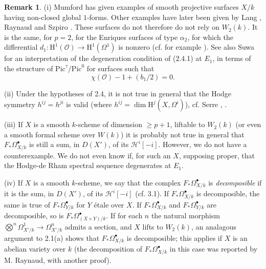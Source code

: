 \documentclass[10pt,reqno]{article}
\renewcommand{\H}{\mathrm{H}}
\newcommand{\HH}{\mathcal{H}}
\renewcommand{\O}{\mathcal{O}}
\newcommand{\al}{_\ast}
\newcommand{\bh}{^\bullet}
\theoremstyle{plain}
\theoremstyle{definition}
\newtheorem{rmk}[thm]{Remark}
\begin{document}
\begin{rmk}
(i) Mumford \cite{22} has given examples of smooth projective surfaces $X/k$ having non-closed
global $1$-forms. Other examples have later been given by Lang \cite{19}, Raynaud and Szpiro \cite{11}.
These surfaces do not therefore do not rely on $W_2(k)$. It is the same, for $p=2$, for the Enriques surfaces
of type $\alpha_2$, for which the differential $d_1:\H^1(\O)\to\H^1(\Omega^1)$ is nonzero (cf. for example \cite[II~7.3.8]{13}).
See also Suwa \cite{26} for an interpretation of the degeneration condition of (2.4.1) at $E_1$, in terms of the structure of
$\mathrm{Pic}^\tau/\mathrm{Pic}^0$ for surfaces such that
\[
  \chi(\O)-1+(b_1/2)=0.
\]

(ii) Under the hypotheses of 2.4, it is not true in general that the Hodge symmetry $h^{ij}=h^{ji}$ is valid
(where $h^{ij}=\dim\H^j(X,\Omega^i)$), cf. Serre \cite{25}, .

(iii) If $X$ is a smooth $k$-scheme of dimension $\geq p+1$, liftable to $W_2(k)$ (or even a smooth formal scheme over $W(k)$)
it is probably not true in general that $F\al\Omega_{X/k}\bh$ is still a sum, in $D(X')$, of its $\HH^i[-i]$. However,
we do not have a counterexample. We do not even know if, for such an $X$, supposing proper, that the Hodge-de Rham spectral
sequence degenerates at $E_1$.

(iv) If $X$ is a smooth $k$-scheme, we say that the complex $F\al\Omega_{X/k}\bh$ is \emph{decomposible} if
it is the sum, in $D(X')$, of its $\HH^i[-i]$ (cf. 3.1). If $F\al\Omega_{X/k}\bh$ is decomposible, the same is true of
$F\al\Omega_{Y/k}\bh$ for $Y$ {\'e}tale over $X$. If $F\al\Omega_{X/k}\bh$ and $F\al\Omega_{Y/k}\bh$ are decomposible,
so is $F\al\Omega_{(X\times Y)/k}\bh$. If for each $n$ the natural morphism $\bigotimes^n\Omega_{X'/k}^1\to\Omega_{X'/k}^n$
admits a section, and $X$ lifts to $W_2(k)$, an analagous argument to 2.1(a) shows that $F\al\Omega_{X/k}\bh$ is
decomposible; this applies if $X$ is an abelian variety over $k$ (the decomposition of $F\al\Omega_{X/k}\bh$ in this case
was reported by M. Raynaud, with another proof).
\end{rmk}
\end{document}
